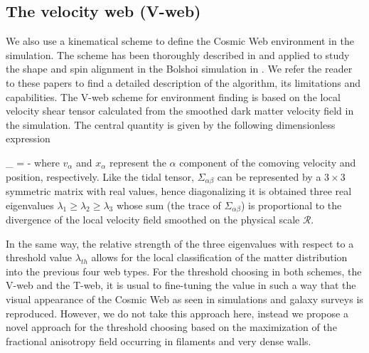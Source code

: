 \documentclass[a4,useAMS,usenatbib,usegraphicx]{latex/mn2e}
\begin{document}
\subsection{The velocity web (V-web)}
\label{subsec:Vweb}


We also use a kinematical scheme to define the Cosmic Web environment in 
the simulation. The scheme has been thoroughly described in 
\citet{Hoffman12} and applied to study the shape and spin alignment in the
Bolshoi simulation in \citet{Libeskind13}. We refer the reader to these 
papers to find a detailed description of the algorithm, its limitations 
and capabilities. The V-web scheme for environment finding is based on the
local velocity shear tensor calculated from the smoothed dark matter 
velocity field in the simulation. The central quantity is given by the 
following dimensionless expression


{	\Sigma_{\alpha\beta} = -	}
where $v_{\alpha}$ and $x_{\alpha}$ represent the $\alpha$ component of 
the comoving velocity and position, respectively. Like the tidal tensor, 
$\Sigma_{\alpha\beta}$ can be represented by a $3\times 3$ symmetric 
matrix with real values, hence diagonalizing it is obtained three real 
eigenvalues $\lambda_{1}\geq\lambda_{2}\geq\lambda_3$ whose sum (the 
trace of $\Sigma_{\alpha\beta}$) is proportional to the divergence of the 
local velocity field smoothed on the physical scale ${\mathcal R}$. 


In the same way, the relative strength of the three eigenvalues with 
respect to a threshold value $\lambda_{th}$ allows for the local 
classification of the matter distribution into the previous four web types. 
For the threshold choosing in both schemes, the V-web and the T-web, it is
usual to fine-tuning the value in such a way that the visual appearance of
the Cosmic Web as seen in simulations and galaxy surveys is reproduced. 
However, we do not take this approach here, instead we propose a novel 
approach for the threshold choosing based on the maximization of the 
fractional anisotropy field occurring in filaments and very dense walls.


\end{document}
